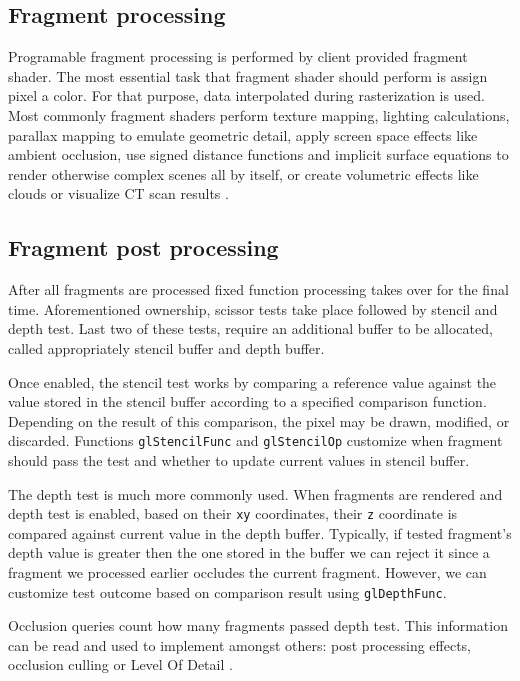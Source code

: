 \subsection{Fragment processing}

Programable fragment processing is performed by client provided fragment shader. The most essential task that fragment shader should perform is assign pixel a color.
For that purpose, data interpolated during rasterization is used. 
Most commonly fragment shaders perform texture mapping, lighting calculations, parallax mapping to emulate geometric detail, apply screen space effects like ambient occlusion, 
use signed distance functions and implicit surface equations to render otherwise complex scenes all by itself, or create volumetric effects like clouds or visualize CT scan results \cite{rtrendering} \cite{glsuperbible}.

\subsection{Fragment post processing}

After all fragments are processed fixed function processing takes over for the final time.
Aforementioned ownership, scissor tests take place followed by stencil and depth test.
Last two of these tests, require an additional buffer to be allocated, called appropriately stencil buffer and depth buffer.

Once enabled, the stencil test works by comparing a reference value against the value stored in the stencil buffer according to a specified comparison function. 
Depending on the result of this comparison, the pixel may be drawn, modified, or discarded. 
Functions \texttt{glStencilFunc} and \texttt{glStencilOp} customize when fragment should pass the test and whether to update current values in stencil buffer.

The depth test is much more commonly used. 
When fragments are rendered and depth test is enabled, based on their \texttt{xy} coordinates, their \texttt{z} coordinate is compared against current value in the depth buffer.
Typically, if tested fragment's depth value is greater then the one stored in the buffer we can reject it since a fragment we processed earlier occludes the current fragment.
However, we can customize test outcome based on comparison result using \texttt{glDepthFunc}.

Occlusion queries count how many fragments passed depth test. This information can be read and used to implement amongst others: post processing effects, occlusion culling or Level Of Detail \cite{rtrendering}.

